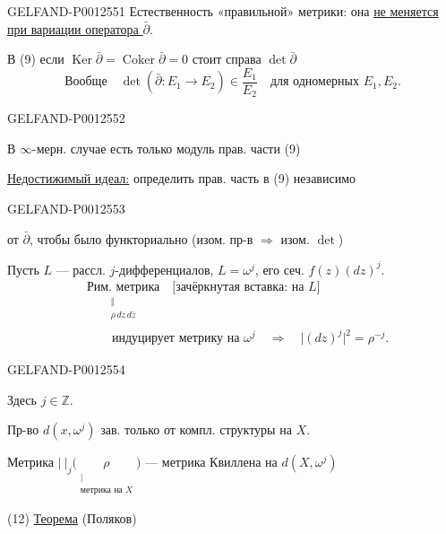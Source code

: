 \begin{GelfandAdjacentEvidence}{GELFAND-P001255}{1}
Естественность «правильной» метрики: она \underline{не меняется при вариации оператора $\bar\partial$}.

В (9) если $\operatorname{Ker}\bar\partial=\operatorname{Coker}\bar\partial=0$
стоит справа $\det\bar\partial$
\begin{equation*}
\text{Вообще}\quad
\det(\bar\partial:E_1\to E_2)\in\frac{E_1}{E_2}
\quad\text{для одномерных }E_1,E_2.
\end{equation*}
\end{GelfandAdjacentEvidence}
\begin{GelfandAdjacentEvidence}{GELFAND-P001255}{2}

В $\infty$-мерн. случае есть только модуль прав. части (9)

\underline{Недостижимый идеал:} определить прав. часть в (9) независимо
\end{GelfandAdjacentEvidence}
\begin{GelfandAdjacentEvidence}{GELFAND-P001255}{3}

от $\bar\partial$, чтобы было функториально (изом. пр-в $\Rightarrow$ изом. $\det$)

Пусть $L$ — рассл. $j$-дифференциалов, $L=\omega^j$,
его сеч. $f(z)(dz)^j$.
\begin{equation*}
\begin{aligned}
&\underset{\substack{\Vert\\\rho\,dz\,d\bar z}}{\text{Рим. метрика}}
\quad\text{[зачёркнутая вставка: на $L$]}\\
&\qquad\text{индуцирует метрику на }\omega^j
\quad\Rightarrow\quad \lvert(dz)^j\rvert^2=\rho^{-j}.
\end{aligned}\tag{11}
\end{equation*}
\end{GelfandAdjacentEvidence}
\begin{GelfandAdjacentEvidence}{GELFAND-P001255}{4}

Здесь $j\in\mathbb Z$.

Пр-во $d(x,\omega^j)$ зав. только от компл. структуры на $X$.

Метрика $\lvert\ \rvert_j\bigl(\underset{\substack{\vert\\\text{метрика на $X$}}}{\rho}\bigr)$
— метрика Квиллена на $d(X,\omega^j)$

\noindent (12) \underline{Теорема} (Поляков)
\end{GelfandAdjacentEvidence}
